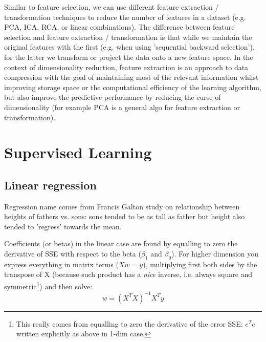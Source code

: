 \documentclass[11pt]{article}
\begin{document}
Similar to feature selection, we can use different feature extraction / transformation techniques to reduce the number of features in a dataset (e.g. PCA, ICA, RCA, or linear combinations). The difference between feature selection and feature extraction / transformation is that while we maintain the original features  with the first (e.g. when using 'sequential backward selection'), for the latter we transform or project the data onto a new feature space. In the context of dimensionality reduction, feature extraction is an approach to data compression with the goal of maintaining most of the relevant information whilst improving storage space or the computational efficiency of the learning algorithm, but also improve the predictive performance by reducing the curse of dimensionality (for example PCA is a general algo for feature extraction or transformation).

\section{Supervised Learning}


\subsection{Linear regression}
Regression name comes from Francis Galton study on relationship between heights of fathers vs. sons: sons  tended to be as tall as father but height also tended to 'regress' towards the mean.  

Coefficients (or betas) in the linear case are found by equalling to zero the derivative of SSE with respect to the beta ($\beta_1$ and $\beta_0$). For higher dimension you express everything in matrix terms ($X w = y$), multiplying first both sides by the transpose of X (because such product has a \textit{nice} inverse, i.e. always square and symmetric\footnote{This really comes from equalling to zero the derivative of the error SSE: $e^T e$ written explicitly as above in 1-dim case.}) and then solve:
\[ w = (X^T X)^{-1} X^T y
\]
\end{document}
